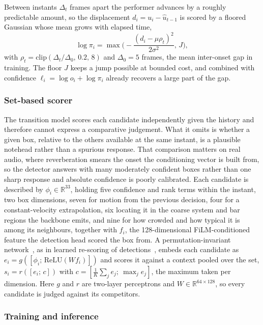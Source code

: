 \documentclass{article}
\begin{document}
Between instants $\Delta_t$ frames apart the performer advances by a roughly
predictable amount, so the displacement $d_i=u_i-\hat u_{t-1}$ is scored by a floored Gaussian whose mean
grows with elapsed time,
\begin{equation}
  \log\pi_i=\max\Big(-\frac{(d_i-\mu\rho_t)^2}{2\sigma^2},\,J\Big),
  \label{eq:prior}
\end{equation}
with $\rho_t=\mathrm{clip}(\Delta_t/\Delta_0,\,0.2,\,8)$ and $\Delta_0=5$
frames, the mean inter-onset gap in training. The floor $J$ keeps a jump
possible at bounded cost, and combined with confidence $\ell_i=\log o_i+\log\pi_i$
already recovers a large part of the gap.

\subsubsection{Set-based scorer}

The transition model scores each candidate independently given the history and
therefore cannot express a comparative judgement. What it omits is whether a
given box, relative to the others available at the same instant, is a plausible
notehead rather than a spurious response. That comparison matters on real
audio, where reverberation smears the onset the conditioning vector is built
from, so the detector answers with many moderately confident boxes rather than
one sharp response and absolute confidence is poorly calibrated. Each candidate
is described by $\phi_i\in\mathbb{R}^{33}$, holding five confidence and rank
terms within the instant, two box dimensions, seven for motion from the
previous decision, four for a constant-velocity extrapolation, six locating it
in the coarse system and bar regions the
backbone emits, and nine for how crowded and how typical it is among its
neighbours, together with $f_i$, the 128-dimensional
FiLM-conditioned feature the detection head scored the box from. A
permutation-invariant network~\cite{zaheer2017deepsets}, as in learned
re-scoring of detections~\cite{hosang2017nms}, embeds each candidate as
$e_i=g([\phi_i;\,\mathrm{ReLU}(Wf_i)])$ and scores it against a context pooled
over the set, $s_i=r([e_i;\,c])$ with
$c=[\tfrac{1}{K}\sum_j e_j;\ \max_j e_j]$, the maximum taken per dimension.
Here $g$ and $r$ are two-layer perceptrons and
$W\in\mathbb{R}^{64\times128}$, so every candidate is judged against its
competitors.

\subsubsection{Training and inference}
\end{document}
